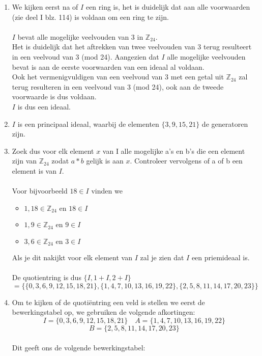 \documentclass[11pt,a4paper,titlepage]{article}
\begin{document}
\begin{enumerate}[label=(\alph*)]
	\item We kijken eerst na of $I$ een ring is, het is duidelijk dat aan alle voorwaarden (zie deel I blz. 114) is voldaan om een ring te zijn.\\ \\
$I$ bevat alle mogelijke veelvouden van 3 in $\mathbb{Z}_{24}$.\\
		Het is duidelijk dat het aftrekken van twee veelvouden van 3 terug resulteert in een veelvoud van 3 (mod 24). Aangezien dat $I$ alle mogelijke veelvouden bevat is aan de eerste voorwaarden van een ideaal al voldaan. \\
		Ook het vermenigvuldigen van een veelvoud van 3 met een getal uit $\mathbb{Z}_{24}$ zal terug resulteren in een veelvoud van 3 (mod 24), ook aan de tweede voorwaarde is dus voldaan.\\
		$I$ is dus een ideaal.
	\item $I$ is een principaal ideaal, waarbij de elementen $\{3,9,15,21\}$ de generatoren zijn.
	\item Zoek dus voor elk element $x$ van I alle mogelijke a's en b's die een element zijn van $\mathbb{Z}_{24}$ zodat $a*b$ gelijk is aan $x$. Controleer vervolgens of a of b een element is van $I$. \\
		\\Voor bijvoorbeeld $18 \in I$ vinden we 
			\begin{itemize}
				\item $1, 18 \in \mathbb{Z}_{24} \text{ en } 18 \in I$
				\item $1, 9 \in \mathbb{Z}_{24} \text{ en } 9 \in I$
				\item $3, 6 \in \mathbb{Z}_{24} \text{ en } 3 \in I$
			\end{itemize}
		Als je dit nakijkt voor elk element van $I$ zal je zien dat $I$ een priemideaal is. \\ \\
		De quotientring is dus $\{I,1+I,2+I\}$ \\ $ = \{\{0,3,6,9,12,15,18,21\}, \{1,4,7,10,13,16,19,22\},\{2,5,8,11,14,17,20,23\}\}$
	\item Om te kijken of de quotiëntring een veld is stellen we eerst de bewerkingstabel op, we gebruiken de volgende afkortingen:
		$$ I = \{0,3,6,9,12,15,18,21\} \quad A = \{1,4,7,10,13,16,19,22\}$$ $$ B = \{2,5,8,11,14,17,20,23\} $$
		\\ Dit geeft ons de volgende bewerkingstabel: \\

\end{enumerate}
\end{document}
